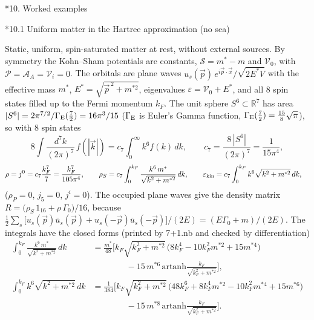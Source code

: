 \documentclass[10pt,a4paper]{article}
\makeatletter
\renewcommand\section{\@startsection{section}{1}{\z@}{-3.5ex \@plus -1ex \@minus -.2ex}{2.3ex \@plus.2ex}{\normalfont\Large\bfseries\raggedright}}
\renewcommand\subsection{\@startsection{subsection}{2}{\z@}{-3.25ex\@plus -1ex \@minus -.2ex}{1.5ex \@plus .2ex}{\normalfont\large\bfseries\raggedright}}
\makeatother
\begin{document}
\section*{10. Worked examples}
\subsection*{10.1 Uniform matter in the Hartree approximation (no sea)}
Static, uniform, spin-saturated matter at rest, without external sources. By symmetry the Kohn–Sham potentials are constants, $\mathcal S=m^*-m$ and $\mathcal V_0$, with $\mathcal P=\mathcal A_A=\mathcal V_i=0$. The orbitals are plane waves $u_s(\vec p)\,e^{i\vec p\cdot\vec x}/\sqrt{2E^*V}$ with the effective mass $m^*$, $E^*=\sqrt{\vec p^{\,2}+m^{*2}}$, eigenvalues $\varepsilon=\mathcal V_0+E^*$, and all 8 spin states filled up to the Fermi momentum $k_F$. The unit sphere $S^6\subset\mathbb R^7$ has area $|S^6|=2\pi^{7/2}/\Gamma_{\rm E}(\tfrac72)=16\pi^3/15$ ($\Gamma_{\rm E}$ is Euler’s Gamma function, $\Gamma_{\rm E}(\tfrac72)=\tfrac{15}{8}\sqrt\pi$), so with 8 spin states
\begin{equation*}
8\int\frac{d^7k}{(2\pi)^7}\,f(|\vec k|)=c_7\int_0^\infty k^6f(k)\,dk,\qquad c_7=\frac{8\,|S^6|}{(2\pi)^7}=\frac{1}{15\pi^4},
\end{equation*}
\begin{align*}
\rho&=j^0=c_7\frac{k_F^7}{7}=\frac{k_F^7}{105\pi^4},\qquad \rho_S=c_7\int_0^{k_F}\frac{k^6\,m^*}{\sqrt{k^2+m^{*2}}}\,dk,\qquad \varepsilon_{\rm kin}=c_7\int_0^{k_F}k^6\sqrt{k^2+m^{*2}}\,dk,
\end{align*}
($\rho_P=0$, $j_5=0$, $j^i=0$). The occupied plane waves give the density matrix $R=\big(\rho_S\,1_{16}+\rho\,\Gamma_0\big)/16$, because $\tfrac12\sum_s\big[u_s(\vec p)\bar u_s(\vec p)+u_s(-\vec p)\bar u_s(-\vec p)\big]/(2E)=(E\Gamma_0+m)/(2E)$. The integrals have the closed forms (printed by 7+1.nb and checked by differentiation)
\begin{align*}
\int_0^{k_F}\frac{k^6\,m^*}{\sqrt{k^2+m^{*2}}}\,dk&=\frac{m^*}{48}\Big[k_F\sqrt{k_F^2+m^{*2}}\,\big(8k_F^4-10k_F^2m^{*2}+15m^{*4}\big) \\
&\qquad\qquad-15\,m^{*6}\,\mathrm{artanh}\frac{k_F}{\sqrt{k_F^2+m^{*2}}}\Big], \\
\int_0^{k_F}k^6\sqrt{k^2+m^{*2}}\,dk&=\frac{1}{384}\Big[k_F\sqrt{k_F^2+m^{*2}}\,\big(48k_F^6+8k_F^4m^{*2}-10k_F^2m^{*4}+15m^{*6}\big) \\
&\qquad\qquad-15\,m^{*8}\,\mathrm{artanh}\frac{k_F}{\sqrt{k_F^2+m^{*2}}}\Big].
\end{align*}
\end{document}
